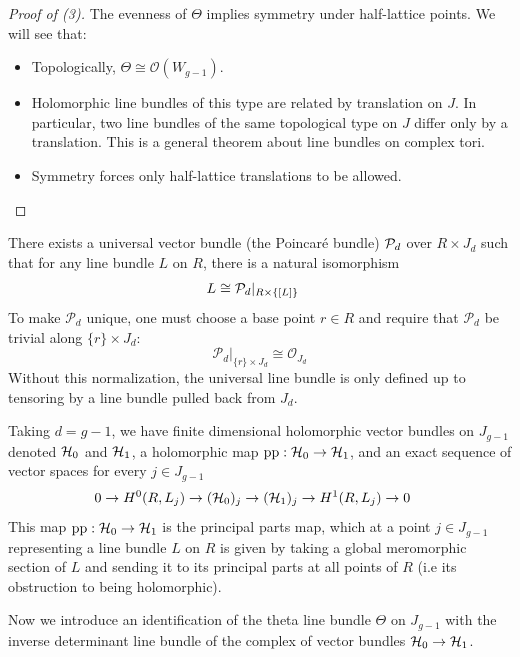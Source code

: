 \documentclass[12pt]{article}
\begin{document}
\begin{proof}[Proof of (3)]
The evenness of $\Theta$ implies symmetry under half-lattice points.
We will see that:
\begin{itemize}
    \item Topologically, $\Theta \cong \mathcal{O}(W_{g-1})$.
    \item Holomorphic line bundles of this type are related by translation on $J$. In particular, two line bundles of the same topological type on $J$ differ only by a translation. This is a general theorem about line bundles on complex tori.
    \item Symmetry forces only half-lattice translations to be allowed. \qedhere
\end{itemize}
\end{proof}
\begin{remark}
    There exists a universal vector bundle (the Poincaré bundle) ${\mathcal{P}}_d$ over $R \times J_d$ such that for any line bundle $L$ on $R$, there is a natural isomorphism \begin{align*}
        L & \cong {\mathcal{P}}_d|_{R \times \{[L]\}}
    \end{align*} To make $\mathcal{P}_d$ unique, one must choose a base point $r\in R$ and require that $\mathcal{P}_d$ be trivial along $\{r\}\times J_d$:
    \[
    \mathcal{P}_d|_{\{r\}\times J_d} \cong \mathcal{O}_{J_d}
    \]
    Without this normalization, the universal line bundle is only defined up to tensoring by a line bundle pulled back from $J_d$.
    
    Taking $d=g-1$, we have finite dimensional holomorphic vector bundles on $J_{g-1}$ denoted ${\mathcal{H}}_0$ and ${\mathcal{H}}_1$, a holomorphic map $\mathrm{pp}:{\mathcal{H}}_0 \to {\mathcal{H}}_1$, and an exact sequence of vector spaces for every $j\in J_{g-1}$\begin{align*}
        0 \to H^0(R, L_j) & \to ({\mathcal{H}}_0)_j \to ({\mathcal{H}}_1)_j \to H^1(R, L_j) \to 0
\end{align*}
This map $\mathrm{pp}:{\mathcal{H}}_0 \to {\mathcal{H}}_1$ is the principal parts map, which at a point $j \in J_{g-1}$ representing a line bundle $L$ on $R$ is given by taking a global meromorphic section of $L$ and sending it to its principal parts at all points of $R$ (i.e its obstruction to being holomorphic). 
\end{remark}

Now we introduce an identification of the theta line bundle $\Theta$ on $J_{g-1}$ with the inverse determinant line bundle of the complex of vector bundles ${\mathcal{H}}_0 \to {\mathcal{H}}_1$.
\end{document}
